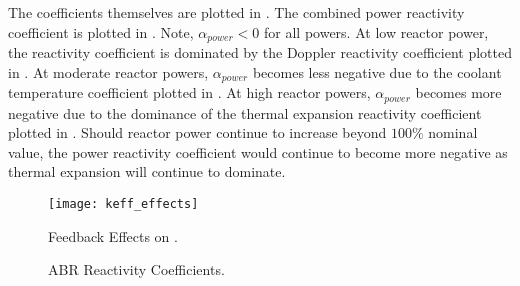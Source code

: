   The coefficients themselves are plotted in 
  . The combined power reactivity
  coefficient is plotted in . Note,
  $\alpha_{power} < 0$ for all powers. At low reactor power, the reactivity
  coefficient is dominated by the Doppler reactivity coefficient plotted in
  . At moderate reactor powers,
  $\alpha_{power}$ becomes less negative due to the coolant temperature
  coefficient plotted in .
  At high reactor powers, $\alpha_{power}$ becomes more negative due to the
  dominance of the thermal expansion reactivity coefficient plotted in
  . Should reactor power
  continue to increase beyond $100\%$ nominal value, the power reactivity
  coefficient would continue to become more negative as thermal expansion will
  continue to dominate.

  \begin{figure}
    \centering
    \texttt{[image: keff\_effects]}
    \caption{Feedback Effects on \keff.}
    \label{fig:keff_effects}
  \end{figure}

  \begin{figure}
    \centering
    \hspace*{\fill}
    \vspace{\baselineskip}
    \hspace*{\fill}
    \caption{ABR Reactivity Coefficients.}
    \label{fig:abr_reactivity_coefficients}
  \end{figure}
